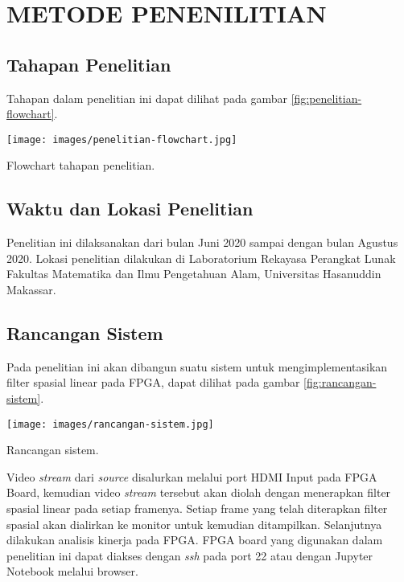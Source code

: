 
\chapter{METODE PENENILITIAN}


\section{Tahapan Penelitian}
Tahapan dalam penelitian ini dapat dilihat pada gambar \ref{fig:penelitian-flowchart}.
\begin{afigure}
    \texttt{[image: images/penelitian-flowchart.jpg]}
    \caption{Flowchart tahapan penelitian.}
    \label{fig:penelitian-flowchart}
\end{afigure}


\section{Waktu dan Lokasi Penelitian}
Penelitian ini dilaksanakan dari bulan Juni 2020 sampai dengan bulan Agustus 2020. Lokasi penelitian dilakukan di Laboratorium Rekayasa Perangkat Lunak Fakultas Matematika dan Ilmu Pengetahuan Alam, Universitas Hasanuddin Makassar.

\section{Rancangan Sistem}
Pada penelitian ini akan dibangun suatu sistem untuk mengimplementasikan filter spasial linear pada FPGA, dapat dilihat pada gambar \ref{fig:rancangan-sistem}.
\begin{afigure}
    \texttt{[image: images/rancangan-sistem.jpg]}
    \caption{Rancangan sistem.}
    \label{fig:rancangan-sistem}
\end{afigure}

Video \textit{stream} dari \textit{source} disalurkan melalui port HDMI Input pada FPGA Board, kemudian video \textit{stream} tersebut akan diolah dengan menerapkan filter spasial linear pada setiap framenya. Setiap frame yang telah diterapkan filter spasial akan dialirkan ke monitor untuk kemudian ditampilkan. Selanjutnya dilakukan analisis kinerja pada FPGA. FPGA board yang digunakan dalam penelitian ini dapat diakses dengan \textit{ssh} pada port 22 atau dengan Jupyter Notebook melalui browser.

\pagebreak


